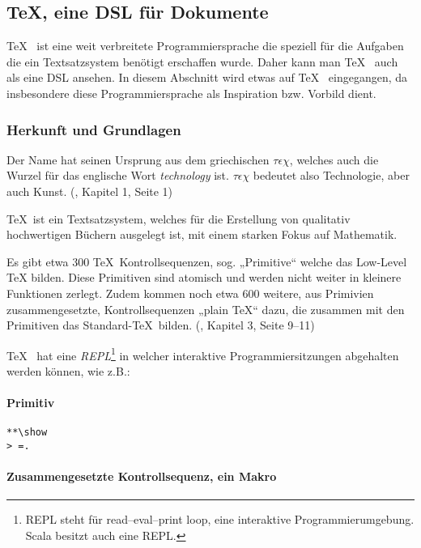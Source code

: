 \subsection{\TeX, eine DSL für Dokumente}

\TeX~ ist eine weit verbreitete Programmiersprache die speziell für die
Aufgaben die ein Textsatzsystem benötigt erschaffen wurde. Daher kann man
\TeX~ auch als eine DSL ansehen. In diesem Abschnitt wird etwas auf
\TeX~ eingegangen, da insbesondere diese Programmiersprache als Inspiration
bzw. Vorbild dient.


\subsubsection{Herkunft und Grundlagen}

Der Name hat seinen Ursprung aus dem griechischen $\tau\epsilon\chi$,
welches auch die Wurzel für das englische Wort \emph{technology} ist.
$\tau\epsilon\chi$ bedeutet also Technologie, aber auch Kunst.
(\cite{tex-a}, Kapitel 1, Seite 1)

\TeX~ist ein Textsatzsystem, welches für die Erstellung
von qualitativ hochwertigen Büchern ausgelegt ist, mit einem starken Fokus auf
Mathematik.

Es gibt etwa 300 \TeX~Kontrollsequenzen, sog. „Primitive“ welche das
Low-Level TeX bilden. Diese Primitiven sind atomisch und werden nicht weiter
in kleinere Funktionen zerlegt.
Zudem kommen noch etwa 600 weitere, aus Primivien zusammengesetzte,
Kontrollsequenzen „plain \TeX“ dazu,
die zusammen mit den Primitiven das Standard-\TeX~bilden.
(\cite{tex-a}, Kapitel 3, Seite 9--11)

\TeX~ hat eine \emph{REPL}\footnote{REPL steht für read–eval–print loop,
eine interaktive Programmierumgebung. Scala besitzt auch eine REPL.}
in welcher interaktive Programmiersitzungen abgehalten werden können,
wie z.B.:

\paragraph{Primitiv}

\begin{verbatim}
**\show
> =.
\end{verbatim}

\paragraph{Zusammengesetzte Kontrollsequenz, ein Makro}

